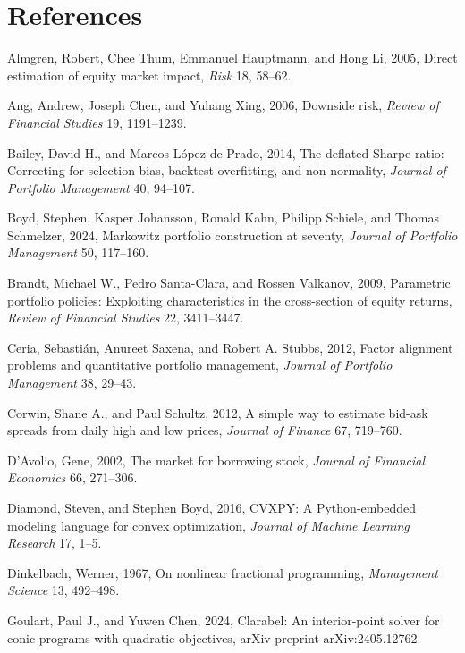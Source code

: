 \documentclass[10pt,twocolumn,letterpaper]{article}
\begin{document}
\section*{References}
\scriptsize
\begin{list}{}{\setlength{\leftmargin}{1.3em}\setlength{\itemindent}{-1.3em}\setlength{\itemsep}{1.0pt}\setlength{\parsep}{0pt}}
\item Almgren, Robert, Chee Thum, Emmanuel Hauptmann, and Hong Li, 2005, Direct estimation of equity market impact, \textit{Risk} 18, 58--62.
\item Ang, Andrew, Joseph Chen, and Yuhang Xing, 2006, Downside risk, \textit{Review of Financial Studies} 19, 1191--1239.
\item Bailey, David H., and Marcos L\'opez de Prado, 2014, The deflated Sharpe ratio: Correcting for selection bias, backtest overfitting, and non-normality, \textit{Journal of Portfolio Management} 40, 94--107.
\item Boyd, Stephen, Kasper Johansson, Ronald Kahn, Philipp Schiele, and Thomas Schmelzer, 2024, Markowitz portfolio construction at seventy, \textit{Journal of Portfolio Management} 50, 117--160.
\item Brandt, Michael W., Pedro Santa-Clara, and Rossen Valkanov, 2009, Parametric portfolio policies: Exploiting characteristics in the cross-section of equity returns, \textit{Review of Financial Studies} 22, 3411--3447.
\item Ceria, Sebasti\'an, Anureet Saxena, and Robert A. Stubbs, 2012, Factor alignment problems and quantitative portfolio management, \textit{Journal of Portfolio Management} 38, 29--43.
\item Corwin, Shane A., and Paul Schultz, 2012, A simple way to estimate bid-ask spreads from daily high and low prices, \textit{Journal of Finance} 67, 719--760.
\item D'Avolio, Gene, 2002, The market for borrowing stock, \textit{Journal of Financial Economics} 66, 271--306.
\item Diamond, Steven, and Stephen Boyd, 2016, CVXPY: A Python-embedded modeling language for convex optimization, \textit{Journal of Machine Learning Research} 17, 1--5.
\item Dinkelbach, Werner, 1967, On nonlinear fractional programming, \textit{Management Science} 13, 492--498.
\item Goulart, Paul J., and Yuwen Chen, 2024, Clarabel: An interior-point solver for conic programs with quadratic objectives, arXiv preprint arXiv:2405.12762.

\end{list}
\end{document}
